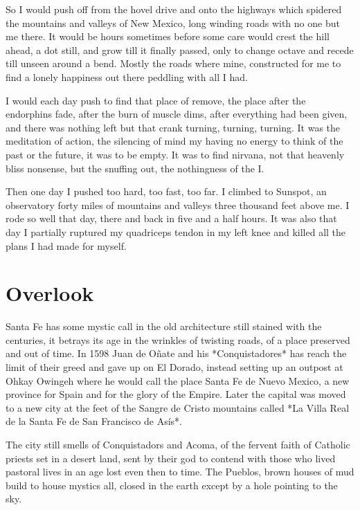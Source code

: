 \documentclass[ebook, 10pt, openright, onecolumn]{memoir}
\begin{document}
So I would push off from the hovel drive and onto the highways which spidered
the mountains and valleys of New Mexico, long winding roads with no one but me
there.  It would be hours sometimes before some care would crest the hill ahead,
a dot still, and grow till it finally passed, only to change octave and recede
till unseen around a bend.  Mostly the roads where mine, constructed for me to
find a lonely happiness out there peddling with all I had.

I would each day push to find that place of remove, the place after the
endorphins fade, after the burn of muscle dims, after everything had been given,
and there was nothing left but that crank turning, turning, turning.  It was the
meditation of action, the silencing of mind my having no energy to think of the
past or the future, it was to be empty.  It was to find nirvana, not that
heavenly bliss nonsense, but the snuffing out, the nothingness of the I.  

Then one day I pushed too hard, too fast, too far.  I climbed to Sunspot, an
observatory forty miles of mountains and valleys three thousand feet above me.
I rode so well that day, there and back in five and a half hours. It was also
that day I partially ruptured my quadriceps tendon in my left knee and killed
all the plans I had made for myself.


\chapter{Overlook}
\label{cha:overlook}


Santa Fe has some mystic call in the old architecture still stained with the
centuries, it betrays its age in the wrinkles of twisting roads, of a place
preserved and out of time.  In 1598 Juan de Oñate and his *Conquistadores* has
reach the limit of their greed and gave up on El Dorado, instead setting up an
outpost at Ohkay Owingeh where he would call the place Santa Fe de Nuevo
Mexico, a new province for Spain and for the glory of the Empire.  Later the
capital was moved to a new city at the feet of the Sangre de Cristo mountains
called *La Villa Real de la Santa Fe de San Francisco de Asís*.

The city still smells of Conquistadors and Acoma, of the fervent faith of
Catholic priests set in a desert land, sent by their god to contend with those
who lived pastoral lives in an age lost even then to time.  The Pueblos, brown
houses of mud build to house mystics all, closed in the earth except by a hole
pointing to the sky.
\end{document}
